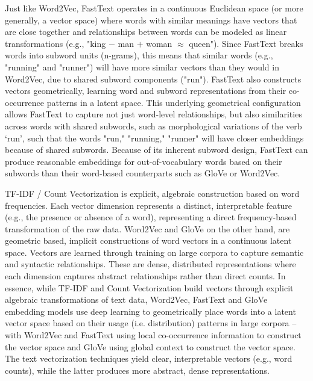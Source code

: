 \documentclass[final]{clv2025}
\begin{document}
Just like Word2Vec, FastText operates in a continuous Euclidean space (or more generally, a vector space) where words with similar meanings have vectors that are close together and relationships between words can be modeled as linear transformations (e.g., "king $-$ man $+$ woman $\approx$ queen"). Since FastText breaks words into subword units (n-grams), this means that similar words (e.g., "running" and "runner") will have more similar vectors than they would in Word2Vec, due to shared subword components ("run"). FastText also constructs vectors geometrically, learning word and subword representations from their co-occurrence patterns in a latent space. This underlying geometrical configuration allows FastText to capture not just word-level relationships, but also similarities across words with shared subwords, such as morphological variations of the verb ‘run’, such that the words "run," "running," "runner" will have closer embeddings because of shared subwords. Because of its inherent subword design, FastText can produce reasonable embeddings for out-of-vocabulary words based on their subwords than their word-based counterparts such as GloVe or Word2Vec.

TF-IDF / Count Vectorization is explicit, algebraic construction based on word frequencies. Each vector dimension represents a distinct, interpretable feature (e.g., the presence or absence of a word), representing a direct frequency-based transformation of the raw data. Word2Vec and GloVe on the other hand, are geometric based, implicit constructions of word vectors in a continuous latent space. Vectors are learned through training on large corpora to capture semantic and syntactic relationships. These are dense, distributed representations where each dimension captures abstract relationships rather than direct counts.  In essence, while TF-IDF and Count Vectorization build vectors through explicit algebraic transformations of text data, Word2Vec, FastText and GloVe embedding models use deep learning to geometrically place words into a latent vector space based on their usage (i.e. distribution) patterns in large corpora – with Word2Vec and FastText using local co-occurrence information to construct the vector space and GloVe using global context to construct the vector space. The text vectorization techniques yield clear, interpretable vectors (e.g., word counts), while the latter produces more abstract, dense representations.
\end{document}
